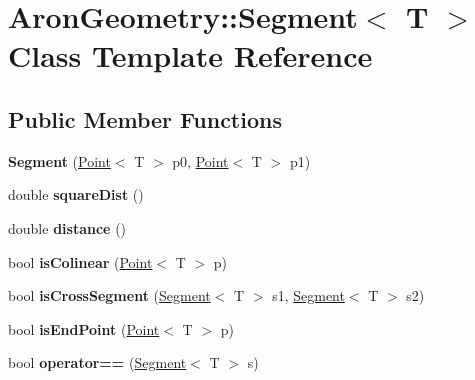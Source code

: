 \hypertarget{class_aron_geometry_1_1_segment}{}\section{Aron\+Geometry\+:\+:Segment$<$ T $>$ Class Template Reference}
\label{class_aron_geometry_1_1_segment}
\subsection*{Public Member Functions}
\begin{DoxyCompactItemize}
\item 
\mbox{\label{class_aron_geometry_1_1_segment_a464f4f8dbe8950ef7c94fe170e1f3fce}} 
{\bfseries Segment} (\mbox{\hyperlink{class_aron_geometry_1_1_point}{Point}}$<$ T $>$ p0, \mbox{\hyperlink{class_aron_geometry_1_1_point}{Point}}$<$ T $>$ p1)
\item 
\mbox{\label{class_aron_geometry_1_1_segment_a476cb580ab1fc62df5bcb684aa9bcb6c}} 
double {\bfseries square\+Dist} ()
\item 
\mbox{\label{class_aron_geometry_1_1_segment_ad8a973579b4789e9d7e4f7f84b425334}} 
double {\bfseries distance} ()
\item 
\mbox{\label{class_aron_geometry_1_1_segment_a9ff59835f5ad9edeef72003aecd1b649}} 
bool {\bfseries is\+Colinear} (\mbox{\hyperlink{class_aron_geometry_1_1_point}{Point}}$<$ T $>$ p)
\item 
\mbox{\label{class_aron_geometry_1_1_segment_af46cd60cb68c4fd238e0feeb82bb08cb}} 
bool {\bfseries is\+Cross\+Segment} (\mbox{\hyperlink{class_aron_geometry_1_1_segment}{Segment}}$<$ T $>$ s1, \mbox{\hyperlink{class_aron_geometry_1_1_segment}{Segment}}$<$ T $>$ s2)
\item 
\mbox{\label{class_aron_geometry_1_1_segment_a4318e5703dd1f408085df1e049dabf0b}} 
bool {\bfseries is\+End\+Point} (\mbox{\hyperlink{class_aron_geometry_1_1_point}{Point}}$<$ T $>$ p)
\item 
\mbox{\label{class_aron_geometry_1_1_segment_a3cb9fb71f3df833bf5a4959f2c514ab4}} 
bool {\bfseries operator==} (\mbox{\hyperlink{class_aron_geometry_1_1_segment}{Segment}}$<$ T $>$ s)
\end{DoxyCompactItemize}

